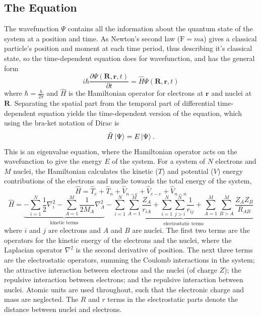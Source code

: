 \subsection{The \schro{} Equation}\label{section: QM_schrodinger}
The wavefunction $\Psi$ contains all the information about the quantum state of the system at a position and time. As Newton's second law ($\bm{\mathrm{F}}=m\bm{\mathrm{a}}$) gives a classical particle's position and moment at each time period, thus describing it's classical state, so the time-dependent \schro{} equation does for wavefunction, and has the general form
\begin{equation}\label{equation: td-schro}
    i\hbar{}\frac{\partial \Psi(\bm{R},\bm{r},t)}{\partial t}=\hat{H}\Psi(\bm{R},\bm{r},t)
\end{equation}
where $\hbar=\frac{h}{2\pi}$ and $\hat{H}$ is the Hamiltonian operator for electrons at $\bm{r}$ and nuclei at $\bm{R}$. Separating the spatial part from the temporal part of differential time-dependent \schro{} equation yields the time-dependent version of the \schro{} equation, which using the bra-ket notation of Dirac is
\begin{equation}\label{equation: ti-schro}
   \hat{H}\ket{\Psi}=E\ket{\Psi}.
\end{equation}
This is an eigenvalue equation, where the Hamiltonian operator acts on the wavefunction to give the energy $E$ of the system. For a system of $N$ electrons and $M$ nuclei, the Hamiltonian calculates the kinetic ($T$) and potential ($V$) energy contributions of the electrons and nuclie towards the total energy of the system,
\begin{equation}\label{equation: H-simple}
\hat{H}=\hat{T}_{e}+\hat{T}_{n}+\hat{V}_{n-e}+\hat{V}_{e-e}+\hat{V}_{n-n}
\end{equation}
\begin{equation}\label{equation: H}
   \hat{H}=\underbrace{-\sum_{i=1}^{N}\frac{1}{2}\nabla_{i}^2 - \sum_{A=1}^{M}\frac{1}{2M_{A}}\nabla_{A}^2}_\text{kinetic terms}-\underbrace{\sum_{i=1}^{N}\sum_{A=1}^{M}\frac{Z_{A}}{r_{iA}}+\sum_{i=1}^{N}\sum_{j>{i}}^{N}\frac{1}{r_{ij}}+\sum_{A=1}^{M}\sum_{B>{A}}^{M}\frac{Z_{A}Z_{B}}{R_{AB}}}_\text{electrostatic terms}
\end{equation}
where $i$ and $j$ are electrons and $A$ and $B$ are nuclei. The first two terms are the operators for the kinetic energy of the electrons and the nuclei, where the Laplacian operator $\nabla^{2}$ is the second derivative of position. The next three terms are the electrostatic operators, summing the Coulomb interactions in the system;  the attractive interaction between electrons and the nuclei (of charge $Z$); the repulsive interaction between electrons; and the repulsive interaction between nuclei. Atomic units are used throughout, such that the electronic charge and mass are neglected. The $R$ and $r$ terms in the electrostatic parts denote the distance between nuclei and electrons.

